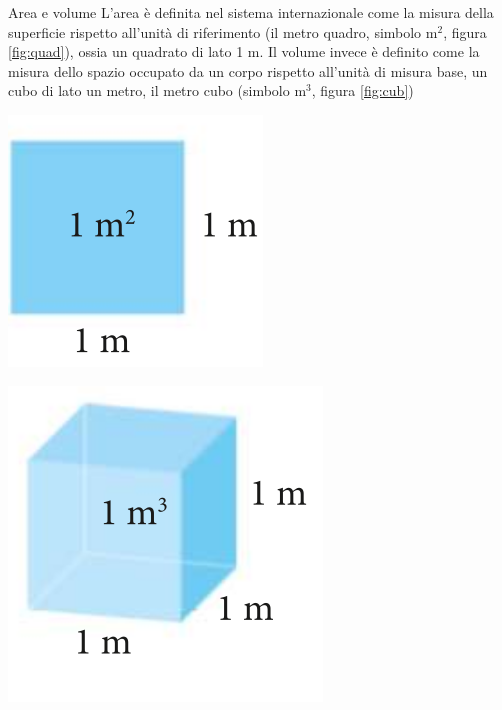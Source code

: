\documentclass[12pt,a4paper,oneside]{book}
\makeatletter
\renewcommand{\section}{\@startsection{section}{1}{\z@}
{-4ex \@plus -1ex \@minus -.4ex}
{1ex \@plus.2ex }
{\normalfont\large\sffamily\bfseries}}
\theoremstyle{esercizio}
\makeatother
\begin{document}
\section{Area e volume}
L'area è definita nel sistema internazionale come la misura della superficie rispetto all'unità di riferimento (il metro quadro, simbolo $\si{\square\meter}$, figura  \ref{fig:quad}), ossia un quadrato di lato 1 m. Il volume invece è definito come la misura dello spazio occupato da un corpo rispetto all'unità di misura base, un cubo di lato un metro, il metro cubo (simbolo $\si{\cubic\meter}$, figura \ref{fig:cub})\\

\begin{minipage}{\linewidth}
	\centering
	\includegraphics[scale=0.3]{quad}
	\label{fig:quad}
\end{minipage}
\begin{minipage}{\linewidth}
	\centering
	\includegraphics[scale=0.3]{cub}
	\label{fig:cub}
\end{minipage}
\end{document}
